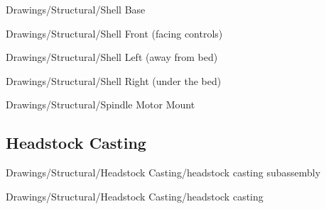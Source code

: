 
{Drawings/Structural/Shell Base}


{Drawings/Structural/Shell Front (facing controls)}


{Drawings/Structural/Shell Left (away from bed)}


{Drawings/Structural/Shell Right (under the bed)}


{Drawings/Structural/Spindle Motor Mount}

\subsection{Headstock Casting}


{Drawings/Structural/Headstock Casting/headstock casting subassembly}


{Drawings/Structural/Headstock Casting/headstock casting}

